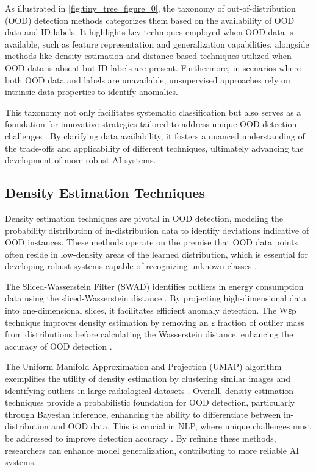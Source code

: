 As illustrated in \autoref{fig:tiny_tree_figure_0}, the taxonomy of out-of-distribution (OOD) detection methods categorizes them based on the availability of OOD data and ID labels. It highlights key techniques employed when OOD data is available, such as feature representation and generalization capabilities, alongside methods like density estimation and distance-based techniques utilized when OOD data is absent but ID labels are present. Furthermore, in scenarios where both OOD data and labels are unavailable, unsupervised approaches rely on intrinsic data properties to identify anomalies.

This taxonomy not only facilitates systematic classification but also serves as a foundation for innovative strategies tailored to address unique OOD detection challenges \cite{lang2023survey}. By clarifying data availability, it fosters a nuanced understanding of the trade-offs and applicability of different techniques, ultimately advancing the development of more robust AI systems.


\subsection{Density Estimation Techniques} \label{subsec:Density Estimation Techniques}

Density estimation techniques are pivotal in OOD detection, modeling the probability distribution of in-distribution data to identify deviations indicative of OOD instances. These methods operate on the premise that OOD data points often reside in low-density areas of the learned distribution, which is essential for developing robust systems capable of recognizing unknown classes \cite{lang2023survey,Delvingint2}.

The Sliced-Wasserstein Filter (SWAD) identifies outliers in energy consumption data using the sliced-Wasserstein distance \cite{pallage2024slicedwassersteinbasedanomalydetectionopen}. By projecting high-dimensional data into one-dimensional slices, it facilitates efficient anomaly detection. The Wεp technique improves density estimation by removing an ε fraction of outlier mass from distributions before calculating the Wasserstein distance, enhancing the accuracy of OOD detection \cite{nietert2023outlierrobustoptimaltransportduality}.

The Uniform Manifold Approximation and Projection (UMAP) algorithm exemplifies the utility of density estimation by clustering similar images and identifying outliers in large radiological datasets \cite{islam2024outlierdetectionlargeradiological}. Overall, density estimation techniques provide a probabilistic foundation for OOD detection, particularly through Bayesian inference, enhancing the ability to differentiate between in-distribution and OOD data. This is crucial in NLP, where unique challenges must be addressed to improve detection accuracy \cite{lang2023survey,Out-of-Dis0}. By refining these methods, researchers can enhance model generalization, contributing to more reliable AI systems.


